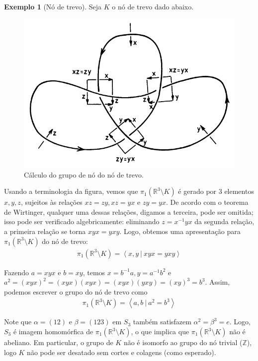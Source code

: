 \documentclass[a4paper,portuguese,11pt,twoside, leqno]{book}
\theoremstyle{definition}
\newtheorem{example}{Exemplo}[section]
\begin{document}
	\begin{example}[Nó de trevo]
		Seja $K$ o nó de trevo dado abaixo.
		\begin{figure}[H]
			\begin{center}
				\includegraphics[width=12cm]{gruponotrevo.png}
			\end{center}\caption{Cálculo do grupo de nó do nó de trevo.}
			\label{grupo no de trevo}
		\end{figure}
		\par\vspace{0.3cm} Usando a terminologia da figura, vemos que $\pi_1(\mathbb{R}^3\setminus K)$ é gerado por $3$ elementos $x, y, z$, sujeitos às relações $xz = zy, xz = yx$ e $zy = yx$. De acordo com o teorema de Wirtinger, qualquer uma dessas relações, digamos a terceira, pode ser omitida; isso pode ser verificado algebricamente: eliminando $z = x^{-1}yx$ da segunda relação, a primeira relação se torna $xyx = yxy$. Logo, obtemos uma apresentação para $\pi_1(\mathbb{R}^3\setminus K)$ do nó de trevo:
		\begin{align*}
		\pi_1(\mathbb{R}^3\setminus K) = \left< x,y \ | \ xyx = yxy \right>
		\end{align*}
		\par\vspace{0.3cm} Fazendo $a = xyx$ e $b = xy$, temos $x = b^{-1}a, y = a^{-1}b^2$ e $a^2 = (xyx)^2 = (xyx)(xyx) = (xyx)(yxy) = (xy)^3 = b^3$. Assim, podemos escrever o grupo do nó de trevo como
		\begin{align*}
		\pi_1(\mathbb{R}^3\setminus K) = \left< a,b \ | \ a^2 = b^3 \right>
		\end{align*}
		\par\vspace{0.3cm} Note que $\alpha = (12)$ e $\beta = (123)$ em $S_3$ também satisfazem $\alpha^2 = \beta^3 = e$. Logo, $S_3$ é imagem homomórfica de $\pi_1(\mathbb{R}^3\setminus K)$, o que implica que $\pi_1(\mathbb{R}^3\setminus K)$ não é abeliano. Em particular, o grupo de $K$ não é isomorfo ao grupo do nó trivial ($\mathbb{Z}$), logo $K$ não pode ser desatado sem cortes e colagens (como esperado).
	\end{example}
\end{document}
